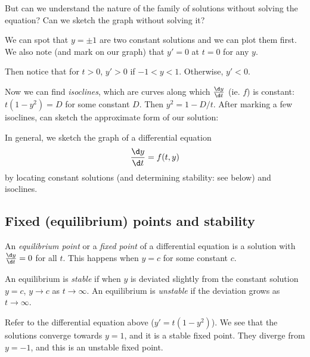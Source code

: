 \documentclass[a4paper]{article}
\begin{document}
  But can we understand the nature of the family of solutions without solving the equation? Can we sketch the graph without solving it?

  We can spot that $y = \pm 1$ are two constant solutions and we can plot them first. We also note (and mark on our graph) that $y' = 0$ at $t = 0$ for any $y$.

  Then notice that for $t > 0$, $y' > 0$ if $-1 < y < 1$. Otherwise, $y' < 0$.

  Now we can find \emph{isoclines}, which are curves along which $\frac{\d y}{\d t}$ (ie. $f$) is constant: $t(1 - y^2) = D$ for some constant $D$. Then $y^2 = 1 - D/t$. After marking a few isoclines, can sketch the approximate form of our solution:


  In general, we sketch the graph of a differential equation 
  \[
    \frac{\d y}{\d t} = f(t, y)
  \]
  by locating constant solutions (and determining stability: see below) and isoclines.

  \subsection{Fixed (equilibrium) points and stability}
  \begin{defi}
    An \emph{equilibrium point} or a \emph{fixed point} of a differential equation is a solution with $\frac{\d y}{\d t} = 0$ for all $t$. This happens when $y = c$ for some constant $c$.
  \end{defi}

  \begin{defi}
    An equilibrium is \emph{stable} if when $y$ is deviated slightly from the constant solution $y = c$, $y \to c$ as $t \to \infty$. An equilibrium is \emph{unstable} if the deviation grows as $t \to \infty$.
  \end{defi}

  \begin{eg}
    Refer to the differential equation above ($y' = t (1 - y^2)$). We see that the solutions converge towards $y = 1$, and it is a stable fixed point. They diverge from $y = -1$, and this is an unstable fixed point.
  \end{eg}
\end{document}
